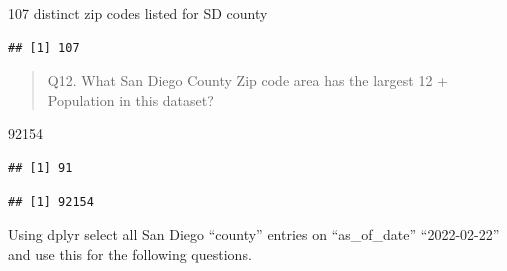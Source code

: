 \documentclass[
]{article}
\newenvironment{Shaded}{\begin{snugshade}}{\end{snugshade}}
\newcommand{\FunctionTok}[1]{\textcolor[rgb]{0.00,0.00,0.00}{#1}}
\newcommand{\NormalTok}[1]{#1}
\newcommand{\OtherTok}[1]{\textcolor[rgb]{0.56,0.35,0.01}{#1}}
\newcommand{\SpecialCharTok}[1]{\textcolor[rgb]{0.00,0.00,0.00}{#1}}
\begin{document}
107 distinct zip codes listed for SD county

\begin{Shaded}
\end{Shaded}

\begin{verbatim}
## [1] 107
\end{verbatim}

\begin{quote}
Q12. What San Diego County Zip code area has the largest 12 + Population
in this dataset?
\end{quote}

92154

\begin{Shaded}
\end{Shaded}

\begin{verbatim}
## [1] 91
\end{verbatim}

\begin{Shaded}
\end{Shaded}

\begin{verbatim}
## [1] 92154
\end{verbatim}

Using dplyr select all San Diego ``county'' entries on ``as\_of\_date''
``2022-02-22'' and use this for the following questions.

\begin{Shaded}
\end{Shaded}
\end{document}
